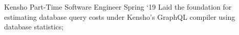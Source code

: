 \experience
    {Kensho}
    {Part-Time Software Engineer}
    {Spring `19}
    {
        Laid the foundation for estimating database query costs under Kensho's GraphQL compiler
        using database statistics;
    }
